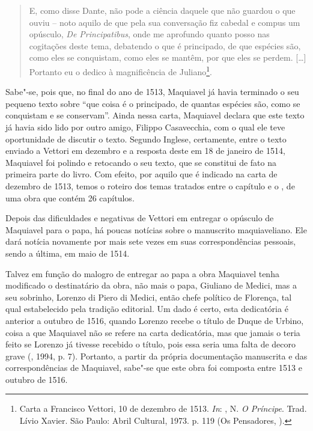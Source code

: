 \begin{quote}
E, como disse Dante, não pode a ciência daquele que não guardou o que
ouviu -- noto aquilo de que pela sua conversação fiz cabedal e compus um
opúsculo, \emph{De Principatibus}, onde me aprofundo quanto posso nas
cogitações deste tema, debatendo o que é principado, de que espécies
são, como eles se conquistam, como eles se mantêm, por que eles se
perdem. {[}\ldots{}{]} Portanto eu o dedico à magnificência de
Juliano\footnote{Carta a Francisco Vettori, 10 de dezembro de 1513.
  \emph{In}: , N. \emph{O Príncipe}. Trad. Lívio
  Xavier. São Paulo: Abril Cultural, 1973. p. 119 (Os Pensadores, ).}.
\end{quote}

Sabe"-se, pois que, no final do ano de 1513, Maquiavel já havia terminado
o seu pequeno texto sobre ``que coisa é o principado, de quantas
espécies são, como se conquistam e se conservam''. Ainda nessa
carta, Maquiavel declara que este texto já havia sido lido por outro
amigo, Filippo Casavecchia, com o qual ele teve oportunidade de discutir
o texto. Segundo Inglese, certamente, entre o texto enviado a Vettori em
dezembro e a resposta deste em 18 de janeiro de 1514, Maquiavel foi
polindo e retocando o seu texto, que se constitui de fato na primeira
parte do livro. Com efeito, por aquilo que é indicado na carta de
dezembro de 1513, temos o roteiro dos temas tratados entre o capítulo 
e o , de uma obra que contém 26 capítulos.

Depois das dificuldades e negativas de Vettori em entregar o opúsculo de
Maquiavel para o papa, há poucas notícias sobre o manuscrito
maquiaveliano. Ele dará notícia novamente por mais sete vezes em suas
correspondências pessoais, sendo a última, em maio de 1514.

Talvez em função do malogro de entregar ao papa a obra Maquiavel tenha
modificado o destinatário da obra, não mais o papa, Giuliano de Medici,
mas a seu sobrinho, Lorenzo di Piero di Medici, então chefe político de
Florença, tal qual estabelecido pela tradição editorial. Um dado é
certo, esta dedicatória é anterior a outubro de 1516, quando Lorenzo
recebe o título de Duque de Urbino, coisa a que Maquiavel não se refere
na carta dedicatória, mas que jamais o teria feito se Lorenzo já tivesse
recebido o título, pois essa seria uma falta de decoro grave (,
1994, p. 7). Portanto, a partir da própria documentação manuscrita e das
correspondências de Maquiavel, sabe"-se que este obra foi composta entre
1513 e outubro de 1516.

